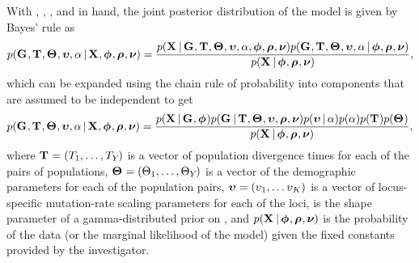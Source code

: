 \begin{linenomath}
With \alignmentVector, \hkyModelVector, \ploidyScalarVector, and
\mutationRateScalarConstantVector in hand, the joint posterior distribution
of the model is given by Bayes' rule as
\begin{equation}
    p(\geneTreeVector, \divTimeMapVector, \demographicParamVector, 
    \locusMutationRateScalarVector, \locusRateHetShapeParameter \given
    \alignmentVector, \hkyModelVector, \ploidyScalarVector,
    \mutationRateScalarConstantVector) =
    \frac{p(\alignmentVector \given \geneTreeVector, \divTimeMapVector,
        \demographicParamVector, \locusMutationRateScalarVector,
        \locusRateHetShapeParameter, \hkyModelVector, \ploidyScalarVector,
        \mutationRateScalarConstantVector)
        p(\geneTreeVector, \divTimeMapVector, \demographicParamVector,
        \locusMutationRateScalarVector, \locusRateHetShapeParameter \given
        \hkyModelVector, \ploidyScalarVector,
        \mutationRateScalarConstantVector)}{
        p(\alignmentVector \given \hkyModelVector, \ploidyScalarVector,
        \mutationRateScalarConstantVector)},
    \label{eq:fullModelCompactJoint}
\end{equation}
which can be expanded using the chain rule of probability into components that
are assumed to be independent to get
\begin{equation}
    p(\geneTreeVector, \divTimeMapVector, \demographicParamVector, 
    \locusMutationRateScalarVector, \locusRateHetShapeParameter \given
    \alignmentVector, \hkyModelVector, \ploidyScalarVector,
    \mutationRateScalarConstantVector) =
    \frac{p(\alignmentVector \given \geneTreeVector, \hkyModelVector)
        p(\geneTreeVector \given \divTimeMapVector, \demographicParamVector,
        \locusMutationRateScalarVector, \ploidyScalarVector,
        \mutationRateScalarConstantVector)
        p(\locusMutationRateScalarVector \given \locusRateHetShapeParameter)
        p(\locusRateHetShapeParameter)
        p(\divTimeMapVector)
        p(\demographicParamVector)}{
        p(\alignmentVector \given \hkyModelVector, \ploidyScalarVector,
        \mutationRateScalarConstantVector)},
    \label{eq:fullModelCompact}
\end{equation}
where
$\mathbf{T_{}} = (T_{1}, \ldots, T_{Y_{}})$
is a vector of population divergence times for each of the \npairs{} pairs of
populations,
$\mathbf{\Theta_{}} = (\Theta_{1}, \ldots,
\Theta_{Y_{}})$
is a vector of the demographic parameters for each of the \npairs{} population
pairs,
$\boldsymbol{\upsilon} = (\upsilon_{1}, \ldots
\upsilon_{K})$
is a vector of locus-specific mutation-rate scaling parameters for each of the
\nlociTotal loci,
\locusRateHetShapeParameter is the shape parameter of a gamma-distributed
prior on \locusMutationRateScalar{}, and
$p(\alignmentVector \given \hkyModelVector, \ploidyScalarVector,
\mutationRateScalarConstantVector)$
is the probability of the data (or the marginal likelihood of the model) given
the fixed constants provided by the investigator.
\end{linenomath}

